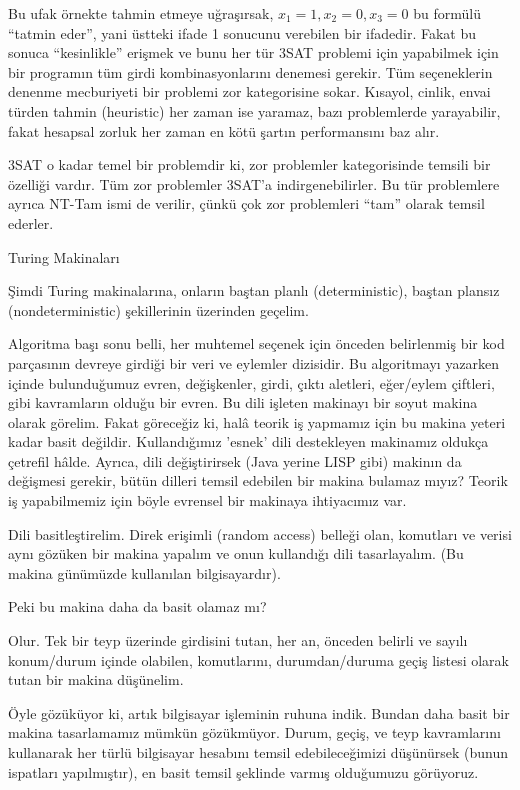\documentclass[12pt,fleqn]{article}\usepackage{../../common}
\begin{document}
Bu ufak örnekte tahmin etmeye uğraşırsak, $x_1=1,x_2=0,x_3=0$ bu formülü
``tatmin eder'', yani üstteki ifade 1 sonucunu verebilen bir
ifadedir. Fakat bu sonuca ``kesinlikle'' erişmek ve bunu her tür 3SAT
problemi için yapabilmek için bir programın tüm girdi kombinasyonlarını
denemesi gerekir. Tüm seçeneklerin denenme mecburiyeti bir problemi zor
kategorisine sokar. Kısayol, cinlik, envai türden tahmin (heuristic) her
zaman ise yaramaz, bazı problemlerde yarayabilir, fakat hesapsal zorluk her
zaman en kötü şartın performansını baz alır.

3SAT o kadar temel bir problemdir ki, zor problemler kategorisinde temsili bir
özelliği vardır. Tüm zor problemler 3SAT'a indirgenebilirler. Bu tür problemlere
ayrıca NT-Tam ismi de verilir, çünkü çok zor problemleri ``tam'' olarak temsil
ederler.

Turing Makinaları

Şimdi Turing makinalarına, onların baştan planlı (deterministic), baştan
plansız (nondeterministic) şekillerinin üzerinden geçelim.

Algoritma başı sonu belli, her muhtemel seçenek için önceden belirlenmiş bir kod
parçasının devreye girdiği bir veri ve eylemler dizisidir. Bu algoritmayı
yazarken içinde bulunduğumuz evren, değişkenler, girdi, çıktı aletleri,
eğer/eylem çiftleri, gibi kavramların olduğu bir evren. Bu dili işleten makinayı
bir soyut makina olarak görelim. Fakat göreceğiz ki, halâ teorik iş yapmamız
için bu makina yeteri kadar basit değildir. Kullandığımız 'esnek' dili
destekleyen makinamız oldukça çetrefil hâlde. Ayrıca, dili değiştirirsek (Java
yerine LISP gibi) makinın da değişmesi gerekir, bütün dilleri temsil edebilen
bir makina bulamaz mıyız?  Teorik iş yapabilmemiz için böyle evrensel bir
makinaya ihtiyacımız var.

Dili basitleştirelim. Direk erişimli (random access) belleği olan, komutları ve
verisi aynı gözüken bir makina yapalım ve onun kullandığı dili tasarlayalım. (Bu
makina günümüzde kullanılan bilgisayardır).

Peki bu makina daha da basit olamaz mı?

Olur. Tek bir teyp üzerinde girdisini tutan, her an, önceden belirli ve sayılı
konum/durum içinde olabilen, komutlarını, durumdan/duruma geçiş listesi olarak
tutan bir makina düşünelim.

Öyle gözüküyor ki, artık bilgisayar işleminin ruhuna indik. Bundan daha basit
bir makina tasarlamamız mümkün gözükmüyor. Durum, geçiş, ve teyp kavramlarını
kullanarak her türlü bilgisayar hesabını temsil edebileceğimizi düşünürsek
(bunun ispatları yapılmıştır), en basit temsil şeklinde varmış olduğumuzu
görüyoruz.
\end{document}
